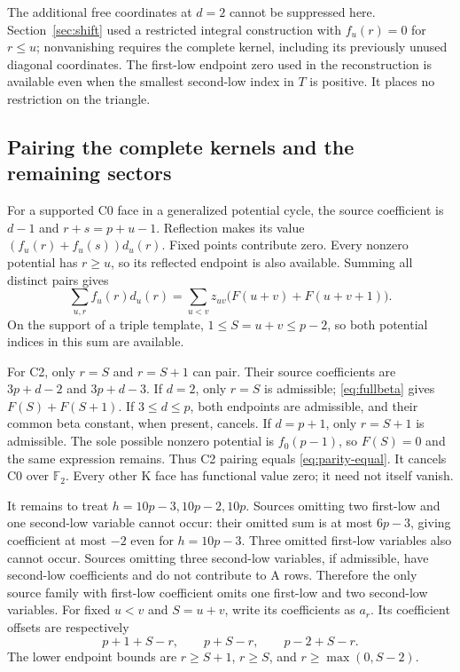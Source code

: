\documentclass[11pt]{article}
\theoremstyle{definition}
\theoremstyle{remark}
\begin{document}
The additional free coordinates at $d=2$ cannot be suppressed here.
Section~\ref{sec:shift} used a restricted integral construction with
$f_u(r)=0$ for $r\leq u$; nonvanishing requires the complete kernel,
including its previously unused diagonal coordinates. The first-low endpoint
zero used in the reconstruction is available even when the smallest
second-low index in $T$ is positive. It places no restriction on the triangle.

\subsection{Pairing the complete kernels and the remaining sectors}

For a supported C0 face in a generalized potential cycle, the source
coefficient is $d-1$ and $r+s=p+u-1$. Reflection makes its value
$(f_u(r)+f_u(s))d_u(r)$. Fixed points contribute zero. Every nonzero
potential has $r\geq u$, so its reflected endpoint is also available.
Summing all distinct pairs gives
\begin{equation}\label{eq:parity-equal}
 \sum_{u,r}f_u(r)d_u(r)
   =\sum_{u<v}z_{uv}\bigl(F(u+v)+F(u+v+1)\bigr).
\end{equation}
On the support of a triple template, $1\leq S=u+v\leq p-2$,
so both potential indices in this sum are available.

For C2, only $r=S$ and $r=S+1$ can pair. Their source coefficients
are $3p+d-2$ and $3p+d-3$. If $d=2$, only $r=S$ is admissible;
\eqref{eq:fullbeta} gives $F(S)+F(S+1)$. If $3\leq d\leq p$,
both endpoints are admissible, and their common beta constant, when
present, cancels. If $d=p+1$, only $r=S+1$ is admissible. The sole
possible nonzero potential is $f_0(p-1)$, so $F(S)=0$ and the same
expression remains. Thus C2 pairing equals \eqref{eq:parity-equal}.
It cancels C0 over $\mathbb F_2$. Every other K face has functional
value zero; it need not itself vanish.

It remains to treat $h=10p-3,10p-2,10p$. Sources omitting two first-low
and one second-low variable cannot occur: their omitted sum is at most
$6p-3$, giving coefficient at most $-2$ even for $h=10p-3$.
Three omitted first-low variables also cannot occur. Sources omitting
three second-low variables, if admissible, have second-low coefficients
and do not contribute to A rows. Therefore the only source family with
first-low coefficient omits one first-low and two second-low variables.
For fixed $u<v$ and $S=u+v$, write its coefficients as $a_r$.
Its coefficient offsets are respectively
\[
 p+1+S-r,\qquad p+S-r,\qquad p-2+S-r.
\]
The lower endpoint bounds are $r\geq S+1$, $r\geq S$, and
$r\geq\max(0,S-2)$.
\end{document}
